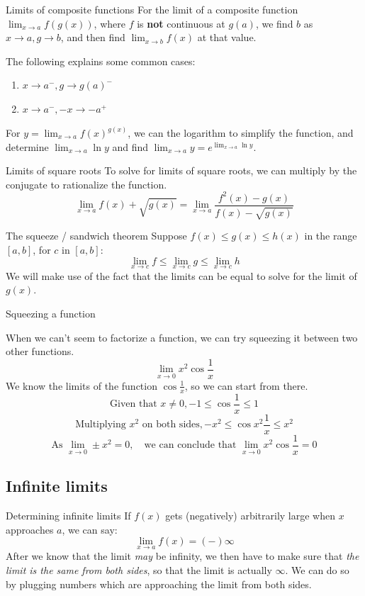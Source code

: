 \begin{knBox}
    {Limits of composite functions}
    For the limit of a composite function $\lim_{x\to a}f(g(x))$, where $f$ is \textbf{not} continuous at $g(a)$, we find $b$ as $x\to a,g\to b$, and then find $\lim_{x\to b}f(x)$ at that value.

    The following explains some common cases:
    \begin{enumerate}
        \item $x\to a^-, g\to g(a)^-$
        \item $x\to a^-, -x\to -a^+$
    \end{enumerate}

    For $y=\lim_{x\to a}f(x)^{g(x)}$, we can the logarithm to simplify the function, and determine $\lim_{x\to a}\ln y$ and find $\lim_{x\to a}y=e^{\lim_{x\to a}\ln y}$.
\end{knBox}
\begin{knBox}
    {Limits of square roots}
    To solve for limits of square roots, we can multiply by the conjugate to rationalize the function.
    \[\lim_{x\to a}f(x)+\sqrt{g(x)}=\lim_{x\to a}\frac{f^2(x)-g(x)}{f(x)-\sqrt{g(x)}}\]
\end{knBox}

\begin{theorem}
    {The squeeze / sandwich theorem}
    Suppose $f(x)\le g(x) \le h(x)$ in the range $[a, b]$, for $c$ in $[a, b]$:
    \[\lim_{x\to c}f \le \lim_{x\to c}g \le \lim_{x\to c}h\]
    We will make use of the fact that the limits can be equal to solve for the limit of $g(x)$.
\end{theorem}

\begin{example}
    Squeezing a function

    When we can't seem to factorize a function, we can try squeezing it between two other functions.
    \[\lim_{x\to 0}x^2\cos\frac{1}{x}\]
    We know the limits of the function $\cos \frac{1}{x}$, so we can start from there.
    \[\text{Given that }x\ne 0, -1\le \cos \frac{1}{x} \le 1\]
    \[\text{Multiplying }x^2\text{ on both sides},-x^2\le \cos x^2\frac{1}{x} \le x^2\]
    \[\text{As }\lim_{x\to 0}\pm x^2=0,\quad\text{we can conclude that }\lim_{x\to 0}x^2\cos\frac{1}{x}=0\]
\end{example}

\subsection{Infinite limits}
\begin{knBox}
    {Determining infinite limits}
    If $f(x)$ gets (negatively) arbitrarily large when $x$ approaches $a$, we can say:
    \[\lim_{x\to a}f(x)=(-)\infty\]
    After we know that the limit \emph{may} be infinity, we then have to make sure that \emph{the limit is the same from both sides}, so that the limit is actually $\infty$. We can do so by plugging numbers which are approaching the limit from both sides.
\end{knBox}

